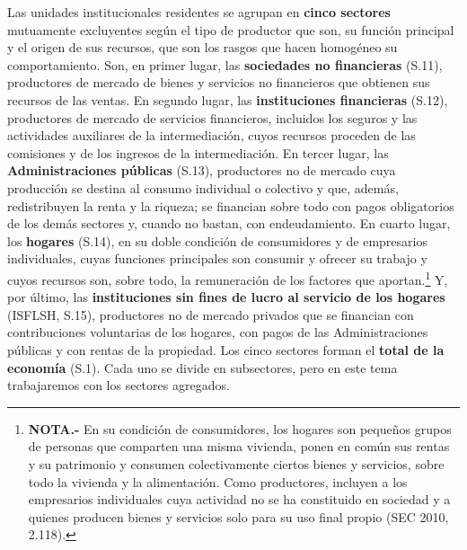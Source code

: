 \documentclass[10pt,a4paper]{article}
\begin{document}
Las unidades institucionales residentes se agrupan en \textbf{cinco sectores} mutuamente excluyentes según el tipo de productor que son, su función principal y el origen de sus recursos, que son los rasgos que hacen homogéneo su comportamiento. Son, en primer lugar, las \textbf{sociedades no financieras} (S.11), productores de mercado de bienes y servicios no financieros que obtienen sus recursos de las ventas. En segundo lugar, las \textbf{instituciones financieras} (S.12), productores de mercado de servicios financieros, incluidos los seguros y las actividades auxiliares de la intermediación, cuyos recursos proceden de las comisiones y de los ingresos de la intermediación. En tercer lugar, las \textbf{Administraciones públicas} (S.13), productores no de mercado cuya producción se destina al consumo individual o colectivo y que, además, redistribuyen la renta y la riqueza; se financian sobre todo con pagos obligatorios de los demás sectores y, cuando no bastan, con endeudamiento. En cuarto lugar, los \textbf{hogares} (S.14), en su doble condición de consumidores y de empresarios individuales, cuyas funciones principales son consumir y ofrecer su trabajo y cuyos recursos son, sobre todo, la remuneración de los factores que aportan.\footnote{%
  \textbf{NOTA.-} En su condición de consumidores, los hogares son pequeños grupos de personas que comparten una misma vivienda, ponen en común sus rentas y su patrimonio y consumen colectivamente ciertos bienes y servicios, sobre todo la vivienda y la alimentación. Como productores, incluyen a los empresarios individuales cuya actividad no se ha constituido en sociedad y a quienes producen bienes y servicios solo para su uso final propio (SEC 2010, 2.118).
} Y, por último, las \textbf{instituciones sin fines de lucro al servicio de los hogares} (ISFLSH, S.15), productores no de mercado privados que se financian con contribuciones voluntarias de los hogares, con pagos de las Administraciones públicas y con rentas de la propiedad. Los cinco sectores forman el \textbf{total de la economía} (S.1). Cada uno se divide en subsectores, pero en este tema trabajaremos con los sectores agregados.
\end{document}

